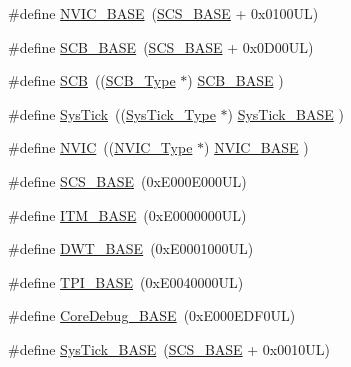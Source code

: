 \begin{DoxyCompactItemize}
\item 
\#define \hyperlink{group___c_m_s_i_s__core__base_gaa0288691785a5f868238e0468b39523d}{N\+V\+I\+C\+\_\+\+B\+A\+SE}~(\hyperlink{group___c_m_s_i_s__core__base_ga3c14ed93192c8d9143322bbf77ebf770}{S\+C\+S\+\_\+\+B\+A\+SE} +  0x0100\+U\+L)
\item 
\#define \hyperlink{group___c_m_s_i_s__core__base_gad55a7ddb8d4b2398b0c1cfec76c0d9fd}{S\+C\+B\+\_\+\+B\+A\+SE}~(\hyperlink{group___c_m_s_i_s__core__base_ga3c14ed93192c8d9143322bbf77ebf770}{S\+C\+S\+\_\+\+B\+A\+SE} +  0x0\+D00\+U\+L)
\item 
\#define \hyperlink{group___c_m_s_i_s__core__base_gaaaf6477c2bde2f00f99e3c2fd1060b01}{S\+CB}~((\hyperlink{struct_s_c_b___type}{S\+C\+B\+\_\+\+Type}       $\ast$)     \hyperlink{group___c_m_s_i_s__core__base_gad55a7ddb8d4b2398b0c1cfec76c0d9fd}{S\+C\+B\+\_\+\+B\+A\+SE}      )
\item 
\#define \hyperlink{group___c_m_s_i_s__core__base_gacd96c53beeaff8f603fcda425eb295de}{Sys\+Tick}~((\hyperlink{struct_sys_tick___type}{Sys\+Tick\+\_\+\+Type}   $\ast$)     \hyperlink{group___c_m_s_i_s__core__base_ga58effaac0b93006b756d33209e814646}{Sys\+Tick\+\_\+\+B\+A\+SE}  )
\item 
\#define \hyperlink{group___c_m_s_i_s__core__base_gac8e97e8ce56ae9f57da1363a937f8a17}{N\+V\+IC}~((\hyperlink{struct_n_v_i_c___type}{N\+V\+I\+C\+\_\+\+Type}      $\ast$)     \hyperlink{group___c_m_s_i_s__core__base_gaa0288691785a5f868238e0468b39523d}{N\+V\+I\+C\+\_\+\+B\+A\+SE}     )
\item 
\#define \hyperlink{group___c_m_s_i_s__core__base_ga3c14ed93192c8d9143322bbf77ebf770}{S\+C\+S\+\_\+\+B\+A\+SE}~(0x\+E000\+E000\+U\+L)
\item 
\#define \hyperlink{group___c_m_s_i_s__core__base_gadd76251e412a195ec0a8f47227a8359e}{I\+T\+M\+\_\+\+B\+A\+SE}~(0x\+E0000000\+U\+L)
\item 
\#define \hyperlink{group___c_m_s_i_s__core__base_gafdab534f961bf8935eb456cb7700dcd2}{D\+W\+T\+\_\+\+B\+A\+SE}~(0x\+E0001000\+U\+L)
\item 
\#define \hyperlink{group___c_m_s_i_s__core__base_ga2b1eeff850a7e418844ca847145a1a68}{T\+P\+I\+\_\+\+B\+A\+SE}~(0x\+E0040000\+U\+L)
\item 
\#define \hyperlink{group___c_m_s_i_s__core__base_ga680604dbcda9e9b31a1639fcffe5230b}{Core\+Debug\+\_\+\+B\+A\+SE}~(0x\+E000\+E\+D\+F0\+U\+L)
\item 
\#define \hyperlink{group___c_m_s_i_s__core__base_ga58effaac0b93006b756d33209e814646}{Sys\+Tick\+\_\+\+B\+A\+SE}~(\hyperlink{group___c_m_s_i_s__core__base_ga3c14ed93192c8d9143322bbf77ebf770}{S\+C\+S\+\_\+\+B\+A\+SE} +  0x0010\+U\+L)

\end{DoxyCompactItemize}
